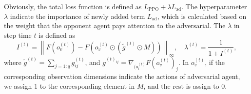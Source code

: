 \documentclass[a4paper]{article}
\begin{document}
Obviously, the total loss function is defined as $L_\text{PPO} + \lambda L_\text{ad}$. The hyperparameter $\lambda$ indicate the importance of newly added term $L_\text{ad}$, 
which is calculated based on the weight that the opponent agent pays attention to the adversarial. 
The $\lambda$ in step time $t$ is defined as
\begin{equation}
    I^{(t)}=\left\|F\left(o_{v}^{(t)}\right)-F\left(o_{v}^{(t)} \odot\left(\tilde{g}^{(t)} \odot M\right)\right)\right\|_{\infty},\quad \lambda^{(t)}=\frac{1}{1+I^{(t)}},
\end{equation}
where $\tilde{g}^{(t)} = \sum_{j=1:q} g_{ij}^{(t)}$, and $g^{(t)_{ij}} = \nabla_{(o^{(t)}_i} F(o^{(t)}_v)_j$. 
In $o^{(t)}_v$, if the corresponding observation dimensions indicate the actions of adversarial agent, we assign 1 to the
corresponding element in $M$, and the rest is assign to 0.
\end{document}
